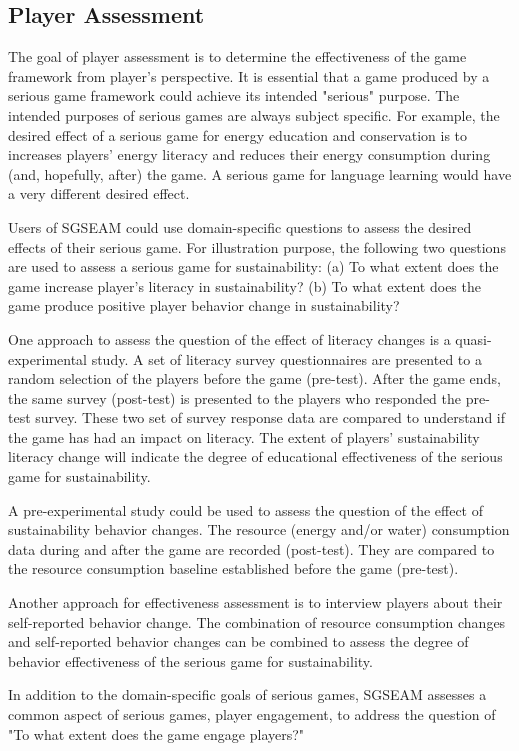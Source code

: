 \subsection{Player Assessment}

The goal of player assessment is to determine the effectiveness of the game
framework from player's perspective. It is essential that a game produced by a serious game
framework could achieve its intended "serious" purpose. The intended purposes of serious games are
always subject specific. For example, the desired effect of a serious game for
energy education and conservation is to increases players' energy literacy and
reduces their energy consumption during (and, hopefully, after) the game. A serious game for
language learning would have a very different desired effect.

Users of SGSEAM could use domain-specific questions to assess the desired effects of their
serious game. For illustration purpose, the following two questions are used to assess a serious
game for sustainability: (a) To what extent does the game increase player's literacy in
sustainability? (b) To what extent does the game produce positive player behavior change in
sustainability?

One approach to assess the question of the effect of literacy changes is a quasi-experimental
study. A set of literacy survey questionnaires are presented to a random selection of the players
before the game (pre-test). After the game ends, the same survey (post-test) is presented to the
players who responded the pre-test survey. These two set of survey response data are compared to
understand if the game has had an impact on literacy. The extent of players' sustainability
literacy change will indicate the degree of educational effectiveness of the serious game for
sustainability.

A pre-experimental study could be used to assess the question of the effect of
sustainability behavior changes. The resource (energy and/or water) consumption data during and
after the game are recorded (post-test). They are compared to the resource consumption baseline
established before the game (pre-test).

Another approach for effectiveness assessment is to interview players about their self-reported
behavior change. The combination of resource consumption changes and self-reported behavior changes
can be combined to assess the degree of behavior effectiveness of the serious game for
sustainability.

In addition to the domain-specific goals of serious games, SGSEAM assesses a common
aspect of serious games, player engagement, to address the question of "To what extent does the
game engage players?"

